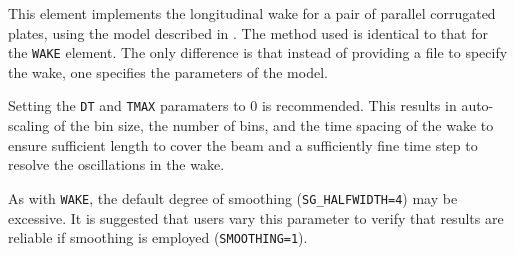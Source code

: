 This element implements the longitudinal wake for a pair of parallel corrugated plates,
using the model described in \cite{Zhang-PRSTAB-18-010702}.
The method used is identical to that for the \verb|WAKE| element.
The only difference is that instead of providing a file to specify the
wake, one specifies the parameters of the model.

Setting the {\tt DT} and {\tt TMAX} paramaters to 0 is recommended.  This results
in auto-scaling of the bin size, the number of bins, and the time spacing of the wake to ensure
sufficient length to cover the beam and a sufficiently fine time step to resolve
the oscillations in the wake.

As with \verb|WAKE|, the default degree of smoothing ({\tt SG\_HALFWIDTH=4}) may be excessive.
It is suggested that users vary this parameter to verify that results
are reliable if smoothing is employed ({\tt SMOOTHING=1}).

